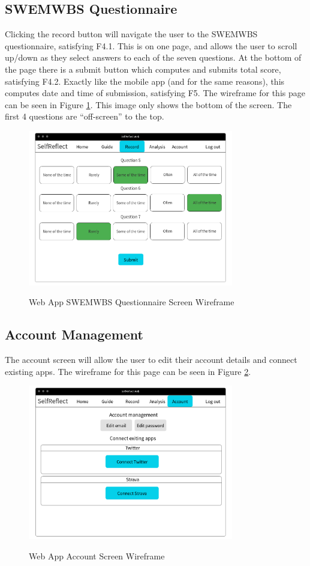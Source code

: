 \documentclass[11pt,openright,a4paper]{report}
\begin{document}
\subsection{SWEMWBS Questionnaire}
Clicking the record button will navigate the user to the SWEMWBS questionnaire, satisfying F4.1. This is on one page, and allows the user to scroll up/down as they select answers to each of the seven questions. At the bottom of the page there is a submit button which computes and submits total score, satisfying F4.2. Exactly like the mobile app (and for the same reasons), this computes date and time of submission, satisfying F5. The wireframe for this page can be seen in Figure \ref{fig:webrecord}. This image only shows the bottom of the screen. The first 4 questions are \enquote{off-screen} to the top.

\begin{figure}[ht]
\centering
\caption{Web App SWEMWBS Questionnaire Screen Wireframe}
\includegraphics[width=0.8\textwidth]{i/webrecord.png}
\label{fig:webrecord}
\end{figure}

\subsection{Account Management} \label{sec:webaccman}
The account screen will allow the user to edit their account details and connect existing apps. The wireframe for this page can be seen in Figure \ref{fig:webaccount}.

\begin{figure}[ht]
\centering
\caption{Web App Account Screen Wireframe}
\includegraphics[width=0.8\textwidth]{i/webaccount.png}
\label{fig:webaccount}
\end{figure}
\end{document}
